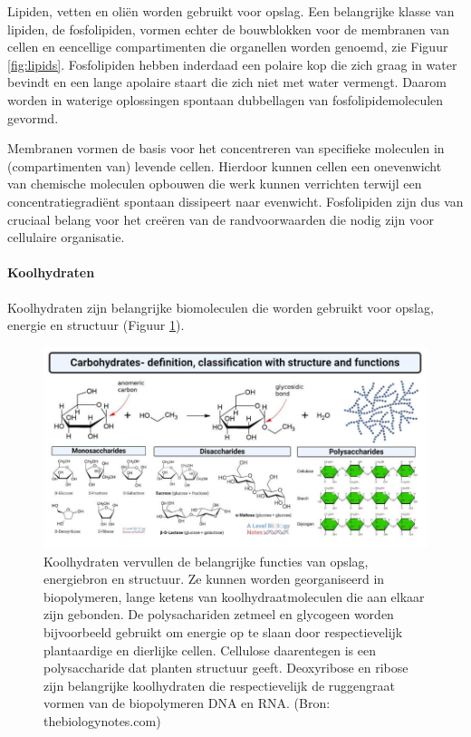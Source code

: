 \documentclass[
  11pt,
]{book}
\begin{document}
Lipiden, vetten en oliën worden gebruikt voor opslag. Een belangrijke klasse van lipiden, de fosfolipiden, vormen echter de bouwblokken voor de membranen van cellen en eencellige compartimenten die organellen worden genoemd, zie Figuur \ref{fig:lipids}. Fosfolipiden hebben inderdaad een polaire kop die zich graag in water bevindt en een lange apolaire staart die zich niet met water vermengt. Daarom worden in waterige oplossingen spontaan dubbellagen van fosfolipidemoleculen gevormd.

\pagebreak

Membranen vormen de basis voor het concentreren van specifieke moleculen in (compartimenten van) levende cellen. Hierdoor kunnen cellen een onevenwicht van chemische moleculen opbouwen die werk kunnen verrichten terwijl een concentratiegradiënt spontaan dissipeert naar evenwicht. Fosfolipiden zijn dus van cruciaal belang voor het creëren van de randvoorwaarden die nodig zijn voor cellulaire organisatie.

\hypertarget{koolhydraten}{%
\paragraph{Koolhydraten}\label{koolhydraten}}

Koolhydraten zijn belangrijke biomoleculen die worden gebruikt voor opslag, energie en structuur (Figuur \ref{fig:carbohydrates}).

\begin{figure}

{\centering \includegraphics[width=1\linewidth]{./figs/Carbohydrates-definition-classification-with-structure-and-functions} 

}

\caption{Koolhydraten vervullen de belangrijke functies van opslag, energiebron en structuur. Ze kunnen worden georganiseerd in biopolymeren, lange ketens van koolhydraatmoleculen die aan elkaar zijn gebonden. De polysachariden zetmeel en glycogeen worden bijvoorbeeld gebruikt om energie op te slaan door respectievelijk plantaardige en dierlijke cellen. Cellulose daarentegen is een polysaccharide dat planten structuur geeft. Deoxyribose en ribose zijn belangrijke koolhydraten die respectievelijk de ruggengraat vormen van de biopolymeren DNA en RNA. (Bron: thebiologynotes.com)}\label{fig:carbohydrates}
\end{figure}
\end{document}
